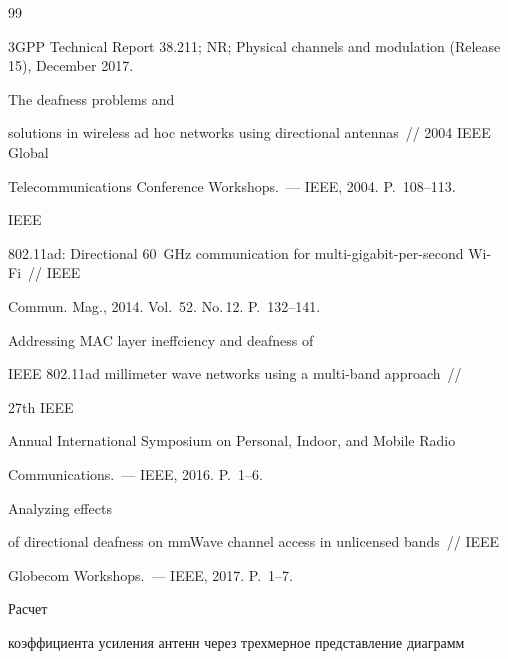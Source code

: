   {\small\frenchspacing


{%




\begin{thebibliography}{99}




3GPP Technical Report 38.211; NR; Physical channels and modulation (Release 15), December 2017. 




 The deafness problems and 


solutions in wireless ad hoc networks using directional antennas~/\!\!/ 2004 IEEE Global 


Telecommunications Conference Workshops.~--- IEEE, 2004. P.~108--113. 




 IEEE 


802.11ad: Directional 60~GHz communication for multi-gigabit-per-second Wi-Fi~/\!\!/ IEEE 


Commun. Mag., 2014. Vol.~52. No.\,12. P.~132--141. 




 Addressing MAC layer ineffciency and deafness of 


IEEE 802.11ad millimeter wave networks using a multi-band approach~/\!\!/ 


 27th  IEEE


Annual International Symposium on Personal, Indoor, and Mobile Radio 


Communications.~--- IEEE, 2016. P.~1--6.




 Analyzing effects 


of directional deafness on mmWave channel access in unlicensed bands~/\!\!/ IEEE 


Globecom Workshops.~--- IEEE, 2017. P.~1--7.




 Расчет 


коэффициента усиления антенн через трехмерное представление диаграмм 



\end{thebibliography}}}

